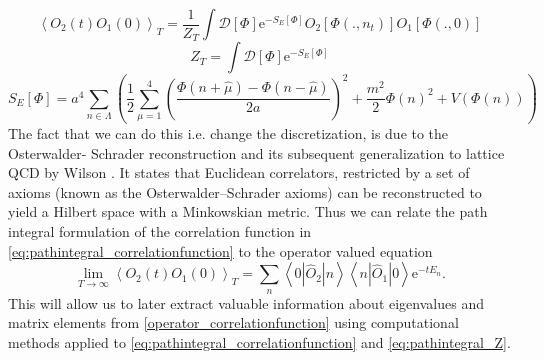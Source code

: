 \documentclass[a4paper,10pt]{article}
\begin{document}
\begin{equation}\label{eq:pathintegral_correlationfunction}
\left\langle O_{2}(t) O_{1}(0)\right\rangle_{T}=\frac{1}{Z_{T}} \int \mathcal{D}[\Phi] \mathrm{e}^{-S_{E}[\Phi]} O_{2}\left[\Phi\left(., n_{t}\right)\right] O_{1}[\Phi(., 0)]
\end{equation}
\begin{equation}\label{eq:pathintegral_Z}
Z_{T}=\int \mathcal{D}[\Phi] \mathrm{e}^{-S_{E}[\Phi]}
\end{equation}
\begin{equation}
S_{E}[\Phi]=a^{4} \sum_{n \in \Lambda}\left(\frac{1}{2} \sum_{\mu=1}^{4}\left(\frac{\Phi(n+\hat{\mu})-\Phi(n-\hat{\mu})}{2 a}\right)^{2}+\frac{m^{2}}{2} \Phi(n)^{2}+V(\Phi(n))\right)
\end{equation}
The fact that we can do this i.e. change the discretization, is due to the Osterwalder- Schrader reconstruction \cite{glimm2012quantum} and its subsequent generalization to lattice QCD by Wilson \cite{seiler1978lect}. It states that Euclidean correlators, restricted by a set of axioms (known as the Osterwalder–Schrader axioms) can be reconstructed to yield a Hilbert space with a Minkowskian metric. Thus we can relate the path integral formulation of the correlation function in \eqref{eq:pathintegral_correlationfunction} to the operator valued equation 
\begin{equation}\label{operator_correlationfunction}
\lim _{T \rightarrow \infty}\left\langle O_{2}(t) O_{1}(0)\right\rangle_{T}=\sum_{n}\left\langle 0\left|\widehat{O}_{2}\right| n\right\rangle\left\langle n\left|\widehat{O}_{1}\right| 0\right\rangle \mathrm{e}^{-t E_{n}}.
\end{equation}
This will allow us to later extract valuable information about eigenvalues and matrix elements from \eqref{operator_correlationfunction} using computational methods applied to \eqref{eq:pathintegral_correlationfunction}
and \eqref{eq:pathintegral_Z}.
\end{document}
